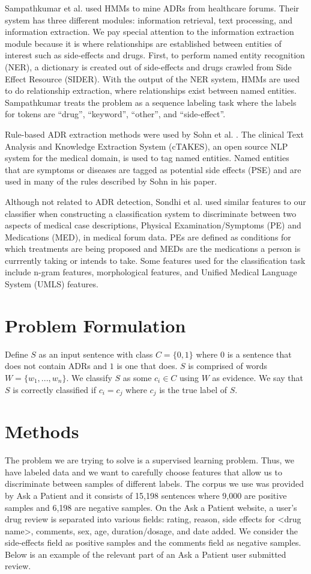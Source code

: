 \documentclass{acm_proc_article-sp}
\begin{document}
Sampathkumar et al. \cite{Sampathkumar} used HMMs to mine ADRs from healthcare forums. Their system has three different modules: information retrieval, text processing, and information extraction. We pay special attention to the information extraction module because it is where relationships are established between entities of interest such as side-effects and drugs. First, to perform named entity recognition (NER), a dictionary is created out of side-effects and drugs crawled from Side Effect Resource (SIDER). With the output of the NER system, HMMs are used to do relationship extraction, where relationships exist between named entities. Sampathkumar treats the problem as a sequence labeling task where the labels for tokens are ``drug'', ``keyword'', ``other'', and ``side-effect''.

Rule-based ADR extraction methods were used by Sohn et al. \cite{Sohn}. The clinical Text Analysis and Knowledge Extraction System (cTAKES), an open source NLP system for the medical domain, is used to tag named entities. Named entities that are symptoms or diseases are tagged as potential side effects (PSE) and are used in many of the rules described by Sohn in his paper.

Although not related to ADR detection, Sondhi et al. \cite{Sondhi}  used similar features to our classifier when constructing a classification system to discriminate between two aspects of medical case descriptions, Physical Examination/Symptoms (PE) and Medications (MED), in medical forum data. PEs are defined as conditions for which treatments are being proposed and MEDs are the medications a person is currrently taking or intends to take. Some features used for the classification task include n-gram features, morphological features, and Unified Medical Language System (UMLS) features.

\section{Problem Formulation}
Define $S$ as an input sentence with class $C = \{0,1\}$ where $0$ is a sentence that does not contain ADRs and $1$ is one that does. $S$ is comprised of words $W = \{w_1,...,w_n\}$. We classify $S$ as some $c_i \in C$ using $W$ as evidence. We say that $S$ is correctly classified if $c_i=c_j$ where $c_j$ is the true label of $S$. 


\section{Methods}
The problem we are trying to solve is a supervised learning problem. Thus, we have labeled data and we want to carefully choose features that allow us to discriminate between samples of different labels. The corpus we use was provided by Ask a Patient and it consists of 15,198 sentences where 9,000 are positive samples and 6,198 are negative samples. On the Ask a Patient website, a user's drug review is separated into various fields: rating, reason, side effects for <drug name>, comments, sex, age, duration/dosage, and date added. We consider the side-effects field as positive samples and the comments field as negative samples. Below is an example of the relevant part of an Ask a Patient user submitted review.
\end{document}

